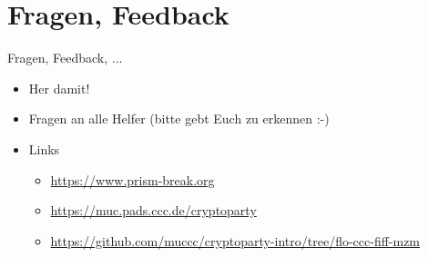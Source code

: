 \section{Fragen, Feedback}
\begin{frame}{Fragen, Feedback, ...}
  \begin{itemize}
    \item{Her damit!}
    \item{Fragen an alle Helfer (bitte gebt Euch zu erkennen :-)}
    \item{Links}
      \begin{itemize}
        \item \url{https://www.prism-break.org}
        \item \url{https://muc.pads.ccc.de/cryptoparty}
        \item \url{https://github.com/muccc/cryptoparty-intro/tree/flo-ccc-fiff-mzm}
      \end{itemize}
  \end{itemize}
\end{frame}

\endinput
